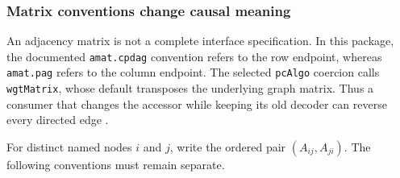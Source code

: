 \hypertarget{matrix-conventions-change-causal-meaning}{%
\subsubsection{Matrix conventions change causal
meaning}\label{matrix-conventions-change-causal-meaning}}

An adjacency matrix is not a complete interface specification. In this
package, the documented \texttt{amat.cpdag} convention refers to the row
endpoint, whereas \texttt{amat.pag} refers to the column endpoint. The
selected \texttt{pcAlgo} coercion calls \texttt{wgtMatrix}, whose
default transposes the underlying graph matrix. Thus a consumer that
changes the accessor while keeping its old decoder can reverse every
directed edge \citep{exec13_pcalg,exec13_pcalg_reuse_primary}.

For distinct named nodes \(i\) and \(j\), write the ordered pair
\((A_{ij},A_{ji})\). The following conventions must remain separate.


